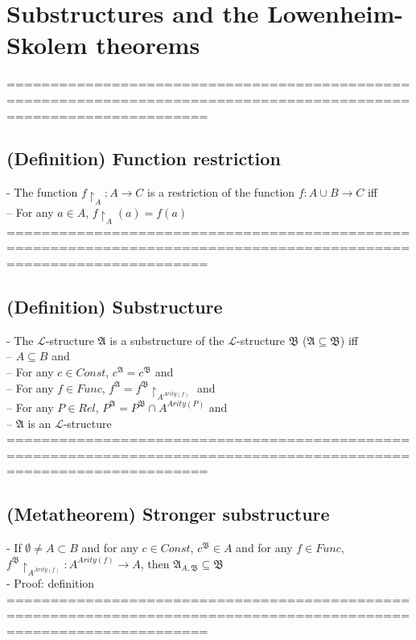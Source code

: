 \documentclass{book}
\newcommand{\means}[2]{#1^{#2}}
\begin{document}
\section{Substructures and the Lowenheim-Skolem theorems}
	===================================================================================================================
\subsection{(Definition) Function restriction} %
	- The function $f \upharpoonright_A: A \rightarrow C$ is a restriction of the function $f: A \cup B \rightarrow C$ iff \\
		-- For any $a \in A$, $f \upharpoonright_A(a) = f(a)$ \\
	===================================================================================================================
\subsection{(Definition) Substructure} %
	- The $\mathcal{L}$-structure $\mathfrak{A}$ is a substructure of the $\mathcal{L}$-structure $\mathfrak{B}$ ($\mathfrak{A} \subseteq \mathfrak{B}$) iff \\
		-- $A \subseteq B$ and \\
		-- For any $c \in Const$, $\means{c}{\mathfrak{A}} = \means{c}{\mathfrak{B}}$ and \\
		-- For any $f \in Func$, $\means{f}{\mathfrak{A}} = \means{f}{\mathfrak{B}} \upharpoonright_{A^{Arity(f)}}$ and \\
		-- For any $P \in Rel$, $\means{P}{\mathfrak{A}} = \means{P}{\mathfrak{B}} \cap A^{Arity(P)}$ and \\
		-- $\mathfrak{A}$ is an $\mathcal{L}$-structure \\
	===================================================================================================================
\subsection{(Metatheorem) Stronger substructure} %
	- If $\emptyset \neq A \subset B$ and for any $c \in Const$, $\means{c}{\mathfrak{B}} \in A$ and for any $f \in Func$, $\means{f}{\mathfrak{B}} \upharpoonright_{A^{Arity(f)}}: A^{Arity(f)} \rightarrow A$, then $\mathfrak{A}_{A, \mathfrak{B}} \subseteq \mathfrak{B}$ \\
	- Proof: definition \\
	===================================================================================================================
\end{document}
